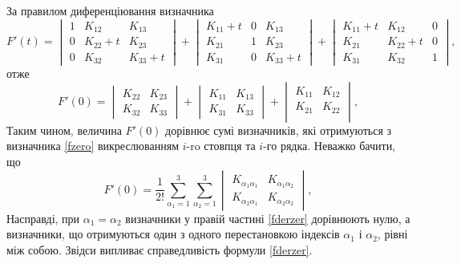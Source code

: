 \documentclass[14pt,twoside]{extreport}
\theoremstyle{mystyle}
\numberwithin{equation}{chapter}
\begin{document}
За правилом диференціювання визначника
\begin{equation}\label{fder}
F'(t)=
\begin{vmatrix}
1 & K_{12} & K_{13}\\
0 & K_{22} + t & K_{23}\\
0 & K_{32} & K_{33} + t
\end{vmatrix}+
\begin{vmatrix}
K_{11} + t & 0 & K_{13}\\
K_{21} & 1 & K_{23}\\
K_{31} & 0 & K_{33} + t
\end{vmatrix}+
\begin{vmatrix}
K_{11} + t & K_{12} & 0\\
K_{21} & K_{22} + t & 0\\
K_{31} & K_{32} & 1
\end{vmatrix},
\end{equation}
отже
\begin{equation}\label{fderzer0}
F'(0)=
\begin{vmatrix}
K_{22} & K_{23}\\
K_{32} & K_{33}
\end{vmatrix}+
\begin{vmatrix}
K_{11} & K_{13}\\
K_{31} & K_{33}
\end{vmatrix}+
\begin{vmatrix}
K_{11} & K_{12}\\
K_{21} & K_{22}\\
\end{vmatrix},
\end{equation}
Таким чином, величина $F'(0)$ дорівнює сумі визначників, які отримуються з визначника \eqref{fzero} викреслюванням $i$-ro стовпця та $i$-го рядка. Неважко бачити, що
\begin{equation}\label{fderzer}
F'(0)=\dfrac{1}{2!}
\sum\limits_{\alpha_1=1}^{3}\sum\limits_{\alpha_2=1}^{3}
\begin{vmatrix}
K_{\alpha_1\alpha_1} & K_{\alpha_1\alpha_2}\\
K_{\alpha_2\alpha_1} & K_{\alpha_2\alpha_2}
\end{vmatrix},
\end{equation}
Насправді, при $\alpha_1 = \alpha_2$ визначники у правій частині \eqref{fderzer} дорівнюють нулю, а визначники, що отримуються один з одного перестановкою індексів $\alpha_1$ і $\alpha_2$, рівні між собою. Звідси випливає справедливість формули \eqref{fderzer}.
\end{document}

